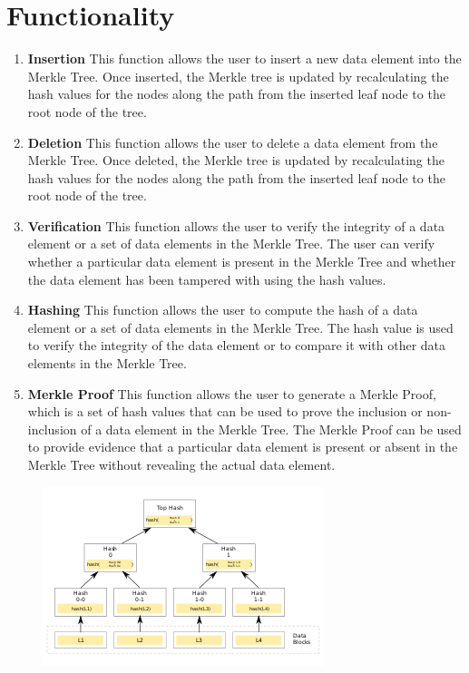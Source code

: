\documentclass{article}
\begin{document}
\section{Functionality}
\begin{enumerate}
    \item \textbf{Insertion} This function allows the user to insert a new data element into the Merkle Tree. Once inserted, the Merkle tree is updated by recalculating the hash values for the nodes along the path from the inserted leaf node to the root node of the tree.
    \item \textbf{Deletion} This function allows the user to delete a data element from the Merkle Tree. Once deleted, the Merkle tree is updated by recalculating the hash values for the nodes along the path from the inserted leaf node to the root node of the tree.
    \item \textbf{Verification} This function allows the user to verify the integrity of a data element or a set of data elements in the Merkle Tree. The user can verify whether a particular data element is present in the Merkle Tree and whether the data element has been tampered with using the hash values.
    \item \textbf{Hashing} This function allows the user to compute the hash of a data element or a set of data elements in the Merkle Tree. The hash value is used to verify the integrity of the data element or to compare it with other data elements in the Merkle Tree.
    \item \textbf{Merkle Proof} This function allows the user to generate a Merkle Proof, which is a set of hash values that can be used to prove the inclusion or non-inclusion of a data element in the Merkle Tree. The Merkle Proof can be used to provide evidence that a particular data element is present or absent in the Merkle Tree without revealing the actual data element.
\end{enumerate}

\begin{figure}[h]
    \centering
    \includegraphics[scale = 1.4]{Hash_Tree.png}
\end{figure}
\end{document}
